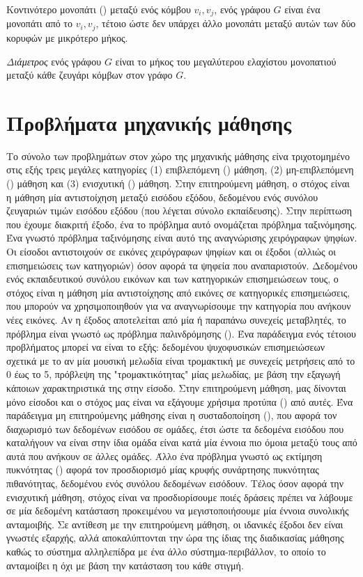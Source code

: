 \begin{definition}
Κοντινότερο μονοπάτι () μεταξύ ενός κόμβου $v_{i}, v_{j}$, ενός γράφου $G$ είναι ένα μονοπάτι από
το $v_{i}, v_{j}$, τέτοιο ώστε δεν υπάρχει άλλο μονοπάτι μεταξύ αυτών των δύο κορυφών με μικρότερο μήκος.
\end{definition}
\textit{Διάμετρος} ενός γράφου $G$ είναι το μήκος του μεγαλύτερου ελαχίστου μονοπατιού μεταξύ κάθε ζευγάρι κόμβων στον γράφο $G$.

\section{Προβλήματα μηχανικής μάθησης}
Το σύνολο των προβλημάτων στον χώρο της μηχανικής μάθησης είνα τριχοτομημένο στις εξής τρεις 
μεγάλες κατηγορίες (1) επιβλεπόμενη () μάθηση, (2) μη-επιβλεπόμενη () μάθηση και (3) ενισχυτική () μάθηση. 
Στην επιτηρούμενη μάθηση, ο στόχος είναι η μάθηση μία αντιστοίχηση μεταξύ εισόδου εξόδου, δεδομένου ενός συνόλου ζευγαριών τιμών εισόδου εξόδου (που λέγεται σύνολο εκπαίδευσης). Στην περίπτωση που έχουμε διακριτή έξοδο, ένα το πρόβλημα αυτό ονομάζεται πρόβλημα ταξινόμησης. Ένα γνωστό πρόβλημα ταξινόμησης είναι αυτό της αναγνώρισης χειρόγραφων ψηφίων. Οι είσοδοι αντιστοιχούν σε εικόνες χειρόγραφων ψηφίων και οι έξοδοι (αλλιώς οι επισημειώσεις των κατηγοριών) όσον αφορά τα ψηφεία που αναπαριστούν.
Δεδομένου ενός εκπαιδευτικού συνόλου εικόνων και των κατηγορικών επισημειώσεων τους, ο στόχος είναι η μάθηση μία αντιστοίχησης από εικόνες σε κατηγορικές επισημειώσεις, που μπορούν να χρησιμοποιηθούν για να αναγνωρίσουμε την κατηγορία που ανήκουν νέες εικόνες.
Αν η έξοδος αποτελείται από μία ή παραπάνω συνεχείς μεταβλητές, το πρόβλημα είναι γνωστό ως πρόβλημα παλινδρόμησης ().
Ένα παράδειγμα ενός τέτοιου προβλήματος μπορεί να είναι το εξής: δεδομένου ψυχοφυσικών επισημειώσεων σχετικά με το αν μία μουσική μελωδία είναι τρομακτική με συνεχείς μετρήσεις από το 0 έως το 5, πρόβλεψη της "τρομακτικότητας" μίας μελωδίας, με βάση την εξαγωγή κάποιων χαρακτηριστικά της στην είσοδο.
Στην επιτηρούμενη μάθηση, μας δίνονται μόνο είσοδοι και ο στόχος μας είναι να εξάγουμε χρήσιμα προτύπα () από αυτές. Ένα παράδειγμα μη επιτηρούμενης μάθησης είναι η συσταδοποίηση (), που αφορά τον διαχωρισμό των δεδομένων εισόδου σε ομάδες, έτσι ώστε τα δεδομένα εισόδου που καταλήγουν να είναι στην ίδια ομάδα είναι κατά μία έννοια πιο όμοια μεταξύ τους από αυτά που ανήκουν σε άλλες ομάδες. Άλλο ένα πρόβλημα γνωστό ως εκτίμηση πυκνότητας () αφορά τον προσδιορισμό μίας κρυφής συνάρτησης πυκνότητας πιθανότητας, δεδομένου ενός συνόλου δεδομένων εισόδουν.
Τέλος όσον αφορά την ενισχυτική μάθηση, στόχος είναι να προσδιορίσουμε ποιές δράσεις πρέπει να λάβουμε σε μία δεδομένη κατάσταση προκειμένου να μεγιστοποιήσουμε μία έννοια συνολικής ανταμοιβής.
Σε αντίθεση με την επιτηρούμενη μάθηση, οι ιδανικές έξοδοι δεν είναι γνωστές εξαρχής, αλλά αποκαλύπτονται την ώρα της ίδιας της διαδικασίας μάθησης καθώς το σύστημα αλληλεπίδρα με ένα άλλο σύστημα-περιβάλλον, το οποίο το ανταμοίβει η όχι με βάση την κατάσταση του κάθε στιγμή.
